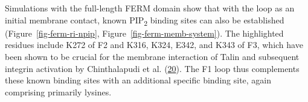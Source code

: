 \documentclass[
  twocolumn]{biophys-new-mod}
\begin{document}
Simulations with the full-length FERM domain show that with the loop as
an initial membrane contact, known PIP\textsubscript{2} binding sites
can also be established
(Figure~\ref{fig-ferm-ri-npip}, Figure~\ref{fig-ferm-memb-system}). The
highlighted residues include K272 of F2 and K316, K324, E342, and K343
of F3, which have been shown to be crucial for the membrane interaction
of Talin and subsequent integrin activation by Chinthalapudi et al.
(\protect\hyperlink{ref-chinthalapudiInteractionTalinCell2018a}{20}).
The F1 loop thus complements these known binding sites with an
additional specific binding site, again comprising primarily lysines.

\begin{figure}

\begin{minipage}[t]{\linewidth}

{\centering 


}

\subcaption{\label{fig-ferm-ri-npip}~}
\end{minipage}%
\newline
\begin{minipage}[t]{\linewidth}

{\centering 

}
\end{minipage}
\end{figure}
\end{document}

